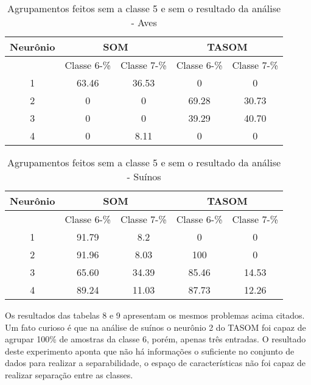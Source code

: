 \begin{table}[h]
\centering
\caption{Agrupamentos feitos sem a classe 5 e sem o resultado da análise - Aves}
\label{my-label}
\begin{tabular}{|c|c|c|c|c|}
\hline
Neurônio & \multicolumn{2}{c|}{SOM} & \multicolumn{2}{c|}{TASOM} \\ \hline
         & Classe 6-\%    & Classe 7-\%   & Classe 6-\%     & Classe 7-\%    \\ \hline
1        & 63.46       & 36.53      & 0            & 0           \\ \hline
2        & 0           & 0          & 69.28        & 30.73       \\ \hline
3        & 0           & 0          & 39.29        & 40.70       \\ \hline
4        & 0           & 8.11       & 0            & 0           \\ \hline
\end{tabular}
\end{table}

\begin{table}[h]
\centering
\caption{Agrupamentos feitos sem a classe 5 e sem o resultado da análise - Suínos}
\label{my-label}
\begin{tabular}{|c|c|c|c|c|}
\hline
Neurônio & \multicolumn{2}{c|}{SOM} & \multicolumn{2}{c|}{TASOM} \\ \hline
         & Classe 6-\%    & Classe 7-\%   & Classe 6-\%    & Classe 7-\%    \\ \hline
1        & 91.79       & 8.2      & 0            & 0           \\ \hline
2        & 91.96           & 8.03          & 100          & 0           \\ \hline
3        & 65.60           & 34.39          & 85.46        & 14.53       \\ \hline
4        & 89.24       & 11.03          & 87.73        & 12.26       \\ \hline
\end{tabular}
\end{table}

Os resultados das tabelas 8 e 9 apresentam os mesmos problemas acima citados. Um fato curioso é que na análise de suínos o neurônio 2 do TASOM foi capaz de agrupar 100\% de amostras da classe 6, porém, apenas três entradas. O resultado deste experimento aponta que não há informações o suficiente no conjunto de dados para realizar a separabilidade, o espaço de características não foi capaz de realizar separação entre as classes. 

